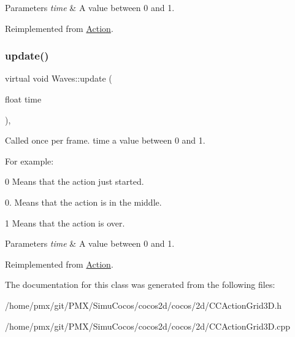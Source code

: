 \begin{DoxyParams}{Parameters}
{\em time} & A value between 0 and 1. \\
\hline
\end{DoxyParams}


Reimplemented from \hyperlink{classAction_a937e646e63915e33ad05ba149bfcf239}{Action}.

\mbox{\label{classWaves_a06c3576ea3fb412c15103d68c8df9b4b}} 
\subsubsection{\texorpdfstring{update()}{update()}\hspace{0.1cm}{\footnotesize\ttfamily [2/2]}}
{\footnotesize\ttfamily virtual void Waves\+::update (\begin{DoxyParamCaption}\item[{float}]{time }\end{DoxyParamCaption})\hspace{0.3cm}{\ttfamily [override]}, {\ttfamily [virtual]}}

Called once per frame. time a value between 0 and 1.

For example\+:
\begin{DoxyItemize}
\item 0 Means that the action just started.
\item 0. Means that the action is in the middle.
\item 1 Means that the action is over.
\end{DoxyItemize}


\begin{DoxyParams}{Parameters}
{\em time} & A value between 0 and 1. \\
\hline
\end{DoxyParams}


Reimplemented from \hyperlink{classAction_a937e646e63915e33ad05ba149bfcf239}{Action}.



The documentation for this class was generated from the following files\+:\begin{DoxyCompactItemize}
\item 
/home/pmx/git/\+P\+M\+X/\+Simu\+Cocos/cocos2d/cocos/2d/C\+C\+Action\+Grid3\+D.\+h\item 
/home/pmx/git/\+P\+M\+X/\+Simu\+Cocos/cocos2d/cocos/2d/C\+C\+Action\+Grid3\+D.\+cpp\end{DoxyCompactItemize}
